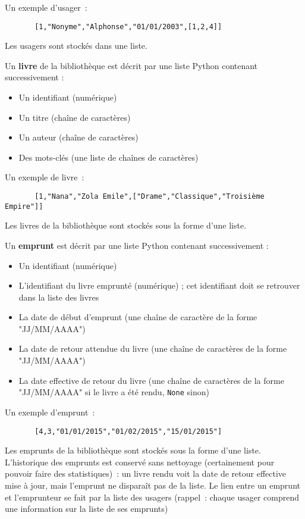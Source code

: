 \documentclass[10pt,a4paper]{sujets-exercices}
\begin{document}
Un exemple d'usager~:

\begin{verbatim}
       [1,"Nonyme","Alphonse","01/01/2003",[1,2,4]]
\end{verbatim}


Les usagers sont stockés dans une liste.

Un \textbf{livre} de la bibliothèque est décrit par une liste Python contenant successivement : 

\begin{itemize}
\item Un identifiant (numérique)
\item Un titre (chaîne de caractères)
\item Un auteur (chaîne de caractères)
\item Des mots-clés (une liste de chaînes de caractères)
\end{itemize}

Un exemple de livre~:

\begin{verbatim}
       [1,"Nana","Zola Emile",["Drame","Classique","Troisième Empire"]]
\end{verbatim}

Les livres de la bibliothèque sont stockés sous la forme d'une liste.

Un \textbf{emprunt} est décrit par une liste Python contenant successivement :

\begin{itemize}
\item Un identifiant (numérique)
\item L'identifiant du livre emprunté (numérique) ; cet identifiant doit se retrouver dans la liste des livres
\item La date de début d'emprunt (une chaîne de caractère de la forme "JJ/MM/AAAA")
\item La date de retour attendue du livre (une chaîne de caractères de la forme "JJ/MM/AAAA")
\item La date effective de retour du livre (une chaîne de caractères de la forme "JJ/MM/AAAA" si le livre a été rendu, \texttt{None} sinon)
\end{itemize}

Un exemple d'emprunt~:

\begin{verbatim}
       [4,3,"01/01/2015","01/02/2015","15/01/2015"]
\end{verbatim}

Les emprunts de la bibliothèque sont stockés sous la forme d'une liste. L'historique des emprunts est conservé sans nettoyage (certainement pour pouvoir faire des statistiques)~: un livre rendu voit la date de retour effective mise à jour, mais l'emprunt ne disparaît pas de la liste. Le lien entre un emprunt et l'emprunteur se fait par la liste des usagers (rappel~: chaque usager comprend une information sur la liste de ses emprunts)
\end{document}
